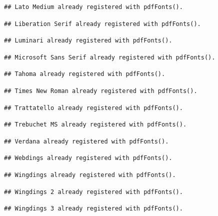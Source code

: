 \documentclass[]{article}
\theoremstyle{definition}
\theoremstyle{definition}
\theoremstyle{definition}
\theoremstyle{remark}
\begin{document}
\begin{verbatim}
## Lato Medium already registered with pdfFonts().
\end{verbatim}

\begin{verbatim}
## Liberation Serif already registered with pdfFonts().
\end{verbatim}

\begin{verbatim}
## Luminari already registered with pdfFonts().
\end{verbatim}

\begin{verbatim}
## Microsoft Sans Serif already registered with pdfFonts().
\end{verbatim}

\begin{verbatim}
## Tahoma already registered with pdfFonts().
\end{verbatim}

\begin{verbatim}
## Times New Roman already registered with pdfFonts().
\end{verbatim}

\begin{verbatim}
## Trattatello already registered with pdfFonts().
\end{verbatim}

\begin{verbatim}
## Trebuchet MS already registered with pdfFonts().
\end{verbatim}

\begin{verbatim}
## Verdana already registered with pdfFonts().
\end{verbatim}

\begin{verbatim}
## Webdings already registered with pdfFonts().
\end{verbatim}

\begin{verbatim}
## Wingdings already registered with pdfFonts().
\end{verbatim}

\begin{verbatim}
## Wingdings 2 already registered with pdfFonts().
\end{verbatim}

\begin{verbatim}
## Wingdings 3 already registered with pdfFonts().
\end{verbatim}
\end{document}
